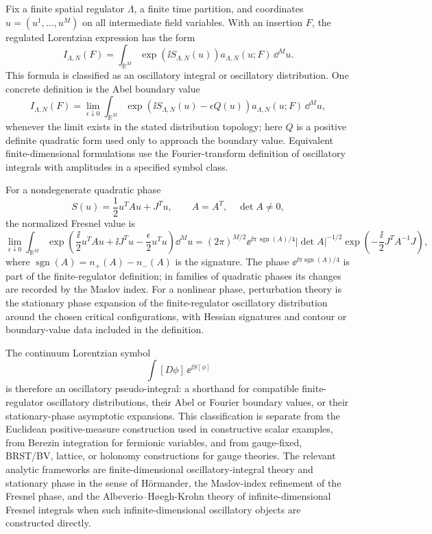 \begin{definition}
\label{def:lorentzian-oscillatory-path-integral}
Fix a finite spatial regulator \(\Lambda\), a finite time partition, and
coordinates \(u=(u^1,\ldots,u^M)\) on all intermediate field variables.  With
an insertion \(F\), the regulated Lorentzian expression has the form
\[
  I_{\Lambda,N}(F)
  =
  \int_{\mathbb R^M}
  \exp\!\left(\ii S_{\Lambda,N}(u)\right)
  a_{\Lambda,N}(u;F)\,\dd^M u .
\]
This formula is classified as an oscillatory integral or oscillatory
distribution.  One concrete definition is the Abel boundary value
\[
  I_{\Lambda,N}(F)
  =
  \lim_{\epsilon\downarrow0}
  \int_{\mathbb R^M}
  \exp\!\left(\ii S_{\Lambda,N}(u)-\epsilon Q(u)\right)
  a_{\Lambda,N}(u;F)\,\dd^M u ,
\]
whenever the limit exists in the stated distribution topology; here \(Q\) is a
positive definite quadratic form used only to approach the boundary value.
Equivalent finite-dimensional formulations use the Fourier-transform
definition of oscillatory integrals with amplitudes in a specified symbol
class.

For a nondegenerate quadratic phase
\[
  S(u)=\frac12 u^T A u+J^T u,
  \qquad
  A=A^T,\quad \det A\ne0 ,
\]
the normalized Fresnel value is
\[
  \lim_{\epsilon\downarrow0}
  \int_{\mathbb R^M}
  \exp\!\left(
    \frac{\ii}{2}u^TAu+\ii J^Tu-\frac{\epsilon}{2}u^Tu
  \right)\dd^M u
  =
  (2\pi)^{M/2}
  \ee^{\ii\pi\,\operatorname{sgn}(A)/4}
  |\det A|^{-1/2}
  \exp\!\left(-\frac{\ii}{2}J^TA^{-1}J\right),
\]
where
\(\operatorname{sgn}(A)=n_+(A)-n_-(A)\) is the signature.  The phase
\(\ee^{\ii\pi\operatorname{sgn}(A)/4}\) is part of the finite-regulator
definition; in families of quadratic phases its changes are recorded by the
Maslov index.  For a nonlinear phase, perturbation theory is the stationary
phase expansion of the finite-regulator oscillatory distribution around the
chosen critical configurations, with Hessian signatures and contour or
boundary-value data included in the definition.

The continuum Lorentzian symbol
\[
  \int[D\phi]\,\ee^{\ii S[\phi]}
\]
is therefore an oscillatory pseudo-integral: a shorthand for compatible
finite-regulator oscillatory distributions, their Abel or Fourier boundary
values, or their stationary-phase asymptotic expansions.  This classification
is separate from the Euclidean positive-measure construction used in
constructive scalar examples, from Berezin integration for fermionic
variables, and from gauge-fixed, BRST/BV, lattice, or holonomy constructions
for gauge theories.  The relevant analytic frameworks are finite-dimensional
oscillatory-integral theory and stationary phase in the sense of
H\"ormander, the Maslov-index refinement of the Fresnel phase, and the
Albeverio--H\o egh-Krohn theory of infinite-dimensional Fresnel integrals
when such infinite-dimensional oscillatory objects are constructed directly.
\end{definition}

